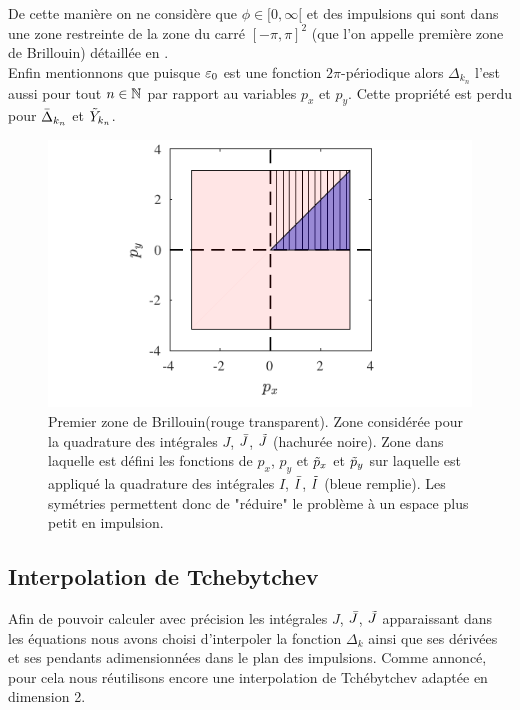 \documentclass[10pt]{article}
\begin{document}
\begin{multicols}{2}
De cette manière on ne considère que $\phi \in [0, \infty[$ et des impulsions qui sont dans une zone restreinte de la zone du carré $[-\pi,\pi]^2$ (que l'on appelle première zone de Brillouin) détaillée en .\\


 Enfin mentionnons que puisque $\varepsilon_0$ est une fonction $2\pi$-périodique alors $\Delta_{k_n}$ l'est aussi pour tout $n\in\mathbb{N}$ par rapport au variables $p_x$ et $p_y$. Cette propriété est perdu pour $\bar{\Delta}_{k_n}$ et $\tilde{Y}_{k_n}$.
 
\begin{figure}[H]
\begin{center}
	\includegraphics[width=0.95\columnwidth]{SurfUtile.pdf}
\end{center}
\caption{Premier zone de Brillouin(rouge transparent). Zone considérée pour la quadrature des intégrales $J$, $\bar{J}$, $\tilde{J}$ (hachurée noire). Zone dans laquelle est défini les fonctions de $p_x$, $p_y$ et $\tilde{p}_x$ et $\tilde{p}_y$ sur laquelle est appliqué la quadrature des intégrales  $I$, $\bar{I}$, $\tilde{I}$ (bleue remplie). Les symétries permettent donc de "réduire" le problème à un espace plus petit en impulsion.}
\label{fig:SurfUtile}
\end{figure}


\subsection{Interpolation de Tchebytchev}

Afin de pouvoir calculer avec précision les intégrales $J$, $\bar{J}$, $\tilde{J}$ apparaissant dans les équations nous avons choisi d'interpoler la fonction $\Delta_k$ ainsi que ses dérivées et ses pendants adimensionnées dans le plan des impulsions. Comme annoncé, pour cela nous réutilisons encore une interpolation de Tchébytchev adaptée en dimension 2. 


\end{multicols}
\end{document}
